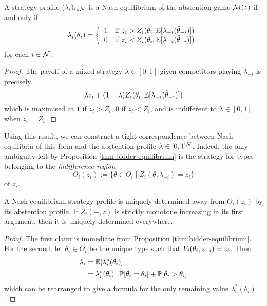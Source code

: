 \begin{proposition}
  \label{thm:bidder-equilibrium}

  A strategy profile $(\lambda_i)_{i\in\mathcal{N}}$ is a Nash equilibrium of the abstention game $\mathcal{M}(z)$ if and only if
  \[
    \lambda_i(\theta_i) = \left\{\begin{array}{ll} 
      1 & \text{if } z_i > Z_i(\theta_i,\mathbb{E}[\lambda_{-i}(\tilde\theta_{-i})]) \\ 
      0 & \text{if } z_i < Z_i(\theta_i,\mathbb{E}[\lambda_{-i}(\tilde\theta_{-i})])
    \end{array}\right.
  \]
  for each $i\in\mathcal{N}$.

\end{proposition}
%
\begin{proof}

  The payoff of a mixed strategy $\lambda\in[0,1]$ given competitors playing $\lambda_{-i}$ is precisely
  \[
    \lambda z_i + (1-\lambda) Z_i(\theta_i,\mathbb{E}[\lambda_{-i}(\tilde\theta_{-i})])
  \]
  which is maximised at $1$ if $z_i>Z_i$, $0$ if $z_i<Z_i$, and is indifferent to $\lambda\in[0,1]$ when $z_i=Z_i$. \qedhere

\end{proof}

Using this result, we can construct a tight correspondence between Nash equilibria of this form and the abstention profile $\bar\lambda\in [0,1]^{\mathcal{N}}$.
%
Indeed, the only ambiguity left by Proposition \ref{thm:bidder-equilibrium} is the strategy for types belonging to the \emph{indifference region}
%
\[  
  \Theta_i(z_i):=\{\theta\in\Theta_i \mid Z_i(\theta,\lambda_{-i}) = z_i\}
\]
%
of $z_i$.


\begin{corollary}
  \label{thm:expected-equilibrium-uniqueness}

  A Nash equilibrium strategy profile is uniquely determined away from $\Theta_i(z_i)$ by its abstention profile.
  If $Z_i(-,z)$ is strictly monotone increasing in its first argument, then it is uniquely determined everywhere.

\end{corollary}
%
\begin{proof}

  The first claim is immediate from Proposition \ref{thm:bidder-equilibrium}.
  For the second, let $\theta_i\in\Theta_i$ be the unique type such that $V_i(\theta_i,z_{-i})=z_i$.
  Then
  \begin{align*}
    \bar\lambda_i  &= \mathbb{E}[\lambda^*_i(\tilde\theta_i)] \\
    &= \lambda^*_i(\theta_i)\cdot\mathbb{P}[\tilde\theta_i=\theta_i] + \mathbb{P}[\tilde\theta_i>\theta_i]
  \end{align*}
  which can be rearranged to give a formula for the only remaining value $\lambda^*_i(\theta_i)$. 
  \qedhere

\end{proof}


